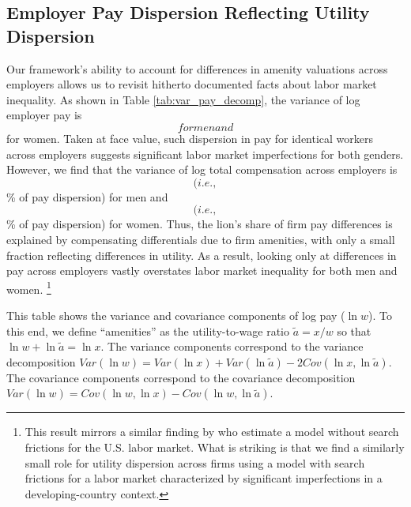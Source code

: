 \subsection{Employer Pay Dispersion Reflecting Utility Dispersion\label{subsec:dispersion}}

Our framework's ability to account for differences in amenity valuations across employers allows us to revisit hitherto documented facts about labor market inequality. As shown in Table \ref{tab:var_pay_decomp}, the variance of log employer pay is $$ for men and $$ for women. Taken at face value, such dispersion in pay for identical workers across employers suggests significant labor market imperfections for both genders. However, we find that the variance of log total compensation across employers is $$ (i.e., $$\% of pay dispersion) for men and $$ (i.e., $$\% of pay dispersion) for women. Thus, the lion's share of firm pay differences is explained by compensating differentials due to firm amenities, with only a small fraction reflecting differences in utility. As a result, looking only at differences in pay across employers vastly overstates labor market inequality for both men and women.%
%
\footnote{This result mirrors a similar finding by \citet{LamadonMogstadSetzler2022} who estimate a model without search frictions for the U.S. labor market. What is striking is that we find a similarly small role for utility dispersion across firms using a model with search frictions for a labor market characterized by significant imperfections in a developing-country context.} %
%

%
\begin{table}[htbp!]
    \caption{Decomposition of employer pay dispersion into utility and amenity terms}
    \label{tab:var_pay_decomp}
    \resizebox{\textwidth}{!}{%
    
    }
    \begin{tablenotes}
        \footnotesize
        This table shows the variance and covariance components of log pay ($\ln w$). To this end, we define ``amenities'' as the utility-to-wage ratio $\tilde{a} = x/w$ so that $\ln w + \ln \tilde{a} = \ln x$. The variance components correspond to the variance decomposition $Var(\ln w) = Var(\ln x) + Var(\ln \tilde{a}) - 2 Cov(\ln x, \ln \tilde{a})$. The covariance components correspond to the covariance decomposition $Var(\ln w) = Cov(\ln w, \ln x) - Cov(\ln w, \ln \tilde{a})$. %
    \end{tablenotes}
    \begin{tablenotes}[Source]
        \sourcemodel%
    \end{tablenotes}
\end{table}
%


